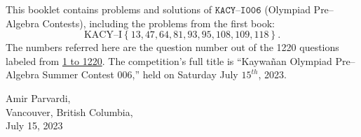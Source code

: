 \documentclass[12pt,a4paper]{memoir}
\theoremstyle{definition}
\begin{document}
		This booklet contains problems and solutions of $\texttt{KACY--I006}$ (Olympiad Pre--Algebra Contests), including the problems from the first book: $$\text{KACY--I}\left\{13,47,64,81,93,95,108,109,118\right\}.$$ The numbers referred here are the question number out of the 1220 questions labeled from \href{https://github.com/parvardi/KACY/blob/main/KACY-VOL-I.pdf}{1 to 1220}. The competition's full title is ``Kaywañan Olympiad Pre--Algebra Summer Contest 006,'' held on Saturday July $15^{th}$, 2023.
%	
\Large
		\begin{flushright}
			Amir Parvardi,\\
			Vancouver, British Columbia,\\
			July 15, 2023
		\end{flushright}
	
\end{document}
